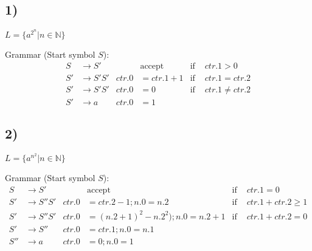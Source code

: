 \subsection*{1)}

$L = \lbrace a^{2^n} | n \in \mathbb{N} \rbrace$

\noindent
Grammar (Start symbol $S$):
\begin{equation*}
 	\begin{aligned}
 		S &\rightarrow S' & & \text{accept} &\text{if }& ctr.1 > 0 \\
 		S' &\rightarrow S'S' & ctr.0 &= ctr.1 + 1 &\text{if }& ctr.1 = ctr.2 \\
 		S' &\rightarrow S'S' & ctr.0 &= 0 &\text{if }& ctr.1 \not= ctr.2 \\
 		S' &\rightarrow a & ctr.0 &= 1&&
	\end{aligned}
\end{equation*}

\subsection*{2)}

$L = \lbrace a^{n^2} | n \in \mathbb{N} \rbrace$

\noindent
Grammar (Start symbol $S$):
\begin{equation*}
 	\begin{aligned}
 		S &\rightarrow S' & & \text{accept} &\text{if }& ctr.1 = 0 \\
 		S' &\rightarrow S''S' & ctr.0 &= ctr.2 - 1; n.0 = n.2 &\text{if }& ctr.1 + ctr.2 \geq 1 \\
 		S' &\rightarrow S''S' & ctr.0 &= (n.2 + 1)^2 - n.2^2); n.0 = n.2 + 1 &\text{if }& ctr.1 + ctr.2 = 0 \\
 		S' &\rightarrow S'' & ctr.0 &= ctr.1; n.0 = n.1 & \\
 		S'' &\rightarrow a & ctr.0 &= 0; n.0 = 1&&
	\end{aligned}
\end{equation*}